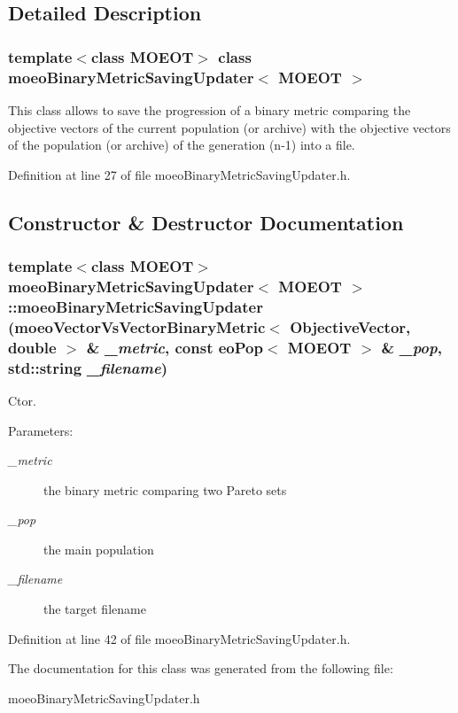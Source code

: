 \subsection{Detailed Description}
\subsubsection*{template$<$class MOEOT$>$ class moeo\-Binary\-Metric\-Saving\-Updater$<$ MOEOT $>$}

This class allows to save the progression of a binary metric comparing the objective vectors of the current population (or archive) with the objective vectors of the population (or archive) of the generation (n-1) into a file. 



Definition at line 27 of file moeo\-Binary\-Metric\-Saving\-Updater.h.

\subsection{Constructor \& Destructor Documentation}
\subsubsection{\setlength{\rightskip}{0pt plus 5cm}template$<$class MOEOT$>$ {\bf moeo\-Binary\-Metric\-Saving\-Updater}$<$ MOEOT $>$::{\bf moeo\-Binary\-Metric\-Saving\-Updater} ({\bf moeo\-Vector\-Vs\-Vector\-Binary\-Metric}$<$ {\bf Objective\-Vector}, double $>$ \& {\em \_\-metric}, const {\bf eo\-Pop}$<$ MOEOT $>$ \& {\em \_\-pop}, std::string {\em \_\-filename})\hspace{0.3cm}{\tt  [inline]}}\label{classmoeoBinaryMetricSavingUpdater_b7c3fb73caf759450367c76d4716bb62}


Ctor. 

\begin{Desc}
\item[Parameters:]
\begin{description}
\item[{\em \_\-metric}]the binary metric comparing two Pareto sets \item[{\em \_\-pop}]the main population \item[{\em \_\-filename}]the target filename \end{description}
\end{Desc}


Definition at line 42 of file moeo\-Binary\-Metric\-Saving\-Updater.h.

The documentation for this class was generated from the following file:\begin{CompactItemize}
\item 
moeo\-Binary\-Metric\-Saving\-Updater.h\end{CompactItemize}

